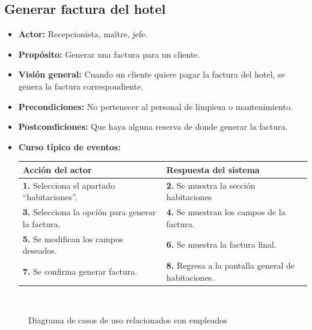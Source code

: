 \documentclass[spanish,a4paper,11pt, twoside]{report}	%
\begin{document}
	\subsection{Generar factura del hotel}
		\begin{itemize}
			\item \textbf{Actor:} Recepcionista, maître, jefe.
			\item \textbf{Propósito:} Generar una factura para un cliente.
			\item \textbf{Visión general:} Cuando un cliente quiere pagar la factura del
					hotel, se genera la factura correspondiente.
			\item \textbf{Precondiciones:} No pertenecer al personal de limpieza o
					mantenimiento.
			\item \textbf{Postcondiciones:} Que haya alguna reserva de donde generar la
				factura.
				\item \textbf{Curso típico de eventos:}  \\
				\begin{tabular}{|p{6cm}||p{6cm}|}
				\hline
				\textbf{Acción del actor} & \textbf{Respuesta del sistema} \\ \hline
				\textbf{1.} Selecciona el apartado ``habitaciones''. & 
				\textbf{2.} Se muestra la sección habitaciones \\ \hline 
				\textbf{3.} Selecciona la opción para generar la factura. & 
				\textbf{4.} Se muestran los campos de la factura.  \\ \hline
				\textbf{5.} Se modifican los campos deseados. & 
				\textbf{6.} Se muestra la factura final. \\ \hline
				\textbf{7.} Se confirma generar factura. & 
				\textbf{8.} Regresa a la pantalla general de habitaciones.\\ \hline
			\end{tabular}
			\\
		\end {itemize}



	\begin{figure}[!h]
		\centering
		\caption{Diagrama de casos de uso relacionados con empleados}
	\end{figure}

\end{document}
